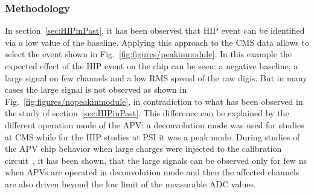 



 \subsubsection{Methodology}
 

In section~\ref{sec:HIPinPast}, it has been observed that HIP event can be identified via a low value of the baseline. Applying this approach to the CMS data allows to select the event shown in Fig.~\ref{fig:figures/peakinmodule}. In this example the expected effect of the HIP event on the chip can be seen: a negative baseline, a large signal on few channels and a low RMS spread of the raw digis. But in many cases the large signal is not observed as shown in Fig.~\ref{fig:figures/nopeakinmodule}, in contradiction to what has been observed in the study of section~\ref{sec:HIPinPast}. This difference can be explained by the different operation mode of the APV: a deconvolution mode was used for studies at CMS while for the HIP studies at PSI it was a peak mode. During studies of the APV chip behavior when large charges were injected to the calibration circuit~\cite{Bainbridge:2002bda}, it has been shown, that the large signals can be observed only for few ns when APVs are operated in deconvolution mode and then the affected channels are also driven beyond the low limit of the measurable ADC values. 


